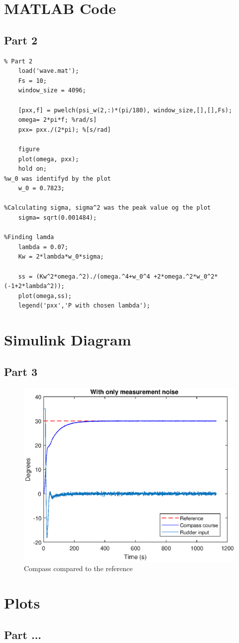 
\appendix

\section{MATLAB Code} \label{sec:matlab_code}
\subsection{Part 2} 

\begin{code}
\label{mat:5.2.a}
\begin{verbatim}
% Part 2
    load('wave.mat');
    Fs = 10;
    window_size = 4096;
    
    [pxx,f] = pwelch(psi_w(2,:)*(pi/180), window_size,[],[],Fs);
    omega= 2*pi*f; %rad/s]                  
    pxx= pxx./(2*pi); %[s/rad]
    
    figure
    plot(omega, pxx);
    hold on;
%w_0 was identifyd by the plot 
    w_0 = 0.7823; 

%Calculating sigma, sigma^2 was the peak value og the plot
    sigma= sqrt(0.001484); 

%Finding lamda 
    lambda = 0.07;
    Kw = 2*lambda*w_0*sigma;
    
    ss = (Kw^2*omega.^2)./(omega.^4+w_0^4 +2*omega.^2*w_0^2*(-1+2*lambda^2));
    plot(omega,ss);
    legend('pxx','P with chosen lambda');
\end{verbatim}
\end{code}



\newpage
\section{Simulink Diagram} \label{sec:simulink_diagrams}
\subsection{Part 3}\label{sec:simulink_diagrams_3}
\begin{figure}[H]
    \centering
    \includegraphics[width=0.5\linewidth]{Part3_pics/3b.eps}
    \caption{Compass compared to the reference}
    \label{sim:5.3.b}
\end{figure}



\newpage
\section{Plots}
\subsection{Part ...}